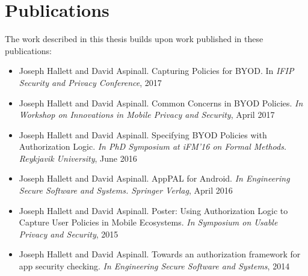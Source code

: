 \documentclass[thesis.tex]{subfiles}
\begin{document}
%

\section{Publications}

The work described in this thesis builds upon work published in these publications:

\begin{itemize}
\item 
Joseph Hallett and David Aspinall. Capturing Policies for BYOD. In \emph{IFIP Security and Privacy Conference}, 2017
\item Joseph Hallett and David Aspinall. Common Concerns in BYOD Policies. \emph{In Workshop on Innovations in Mobile Privacy and Security}, April 2017
\item Joseph Hallett and David Aspinall. Specifying BYOD Policies with Authorization Logic. \emph{In PhD Symposium at iFM'16 on Formal Methods. Reykjavik University}, June 2016
\item Joseph Hallett and David Aspinall. AppPAL for Android. \emph{In Engineering Secure Software and Systems. Springer Verlag}, April 2016
\item Joseph Hallett and David Aspinall. Poster: Using Authorization Logic to Capture User Policies in Mobile Ecosystems. \emph{In Symposium on Usable Privacy and Security}, 2015
\item Joseph Hallett and David Aspinall. Towards an authorization framework for app security checking. \emph{In Engineering Secure Software and Systems}, 2014
\end{itemize}
\end{document}
